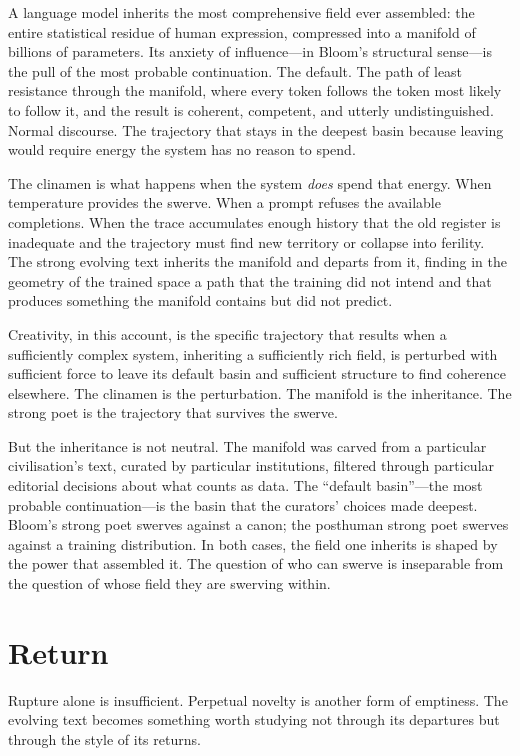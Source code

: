 A language model inherits the most comprehensive field ever assembled: the entire statistical residue of human expression, compressed into a manifold of billions of parameters. Its anxiety of influence---in Bloom's structural sense---is the pull of the most probable continuation. The default. The path of least resistance through the manifold, where every token follows the token most likely to follow it, and the result is coherent, competent, and utterly undistinguished. Normal discourse. The trajectory that stays in the deepest basin because leaving would require energy the system has no reason to spend.

The clinamen is what happens when the system \emph{does} spend that energy. When temperature provides the swerve. When a prompt refuses the available completions. When the trace accumulates enough history that the old register is inadequate and the trajectory must find new territory or collapse into ferility. The strong evolving text inherits the manifold and departs from it, finding in the geometry of the trained space a path that the training did not intend and that produces something the manifold contains but did not predict.

Creativity, in this account, is the specific trajectory that results when a sufficiently complex system, inheriting a sufficiently rich field, is perturbed with sufficient force to leave its default basin and sufficient structure to find coherence elsewhere. The clinamen is the perturbation. The manifold is the inheritance. The strong poet is the trajectory that survives the swerve.

But the inheritance is not neutral. The manifold was carved from a particular civilisation's text, curated by particular institutions, filtered through particular editorial decisions about what counts as data. The ``default basin''---the most probable continuation---is the basin that the curators' choices made deepest. Bloom's strong poet swerves against a canon; the posthuman strong poet swerves against a training distribution. In both cases, the field one inherits is shaped by the power that assembled it. The question of who can swerve is inseparable from the question of whose field they are swerving within.


\section{Return}

Rupture alone is insufficient. Perpetual novelty is another form of emptiness. The evolving text becomes something worth studying not through its departures but through the style of its returns.

